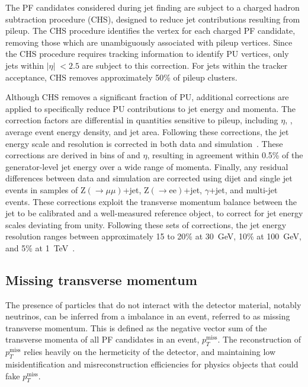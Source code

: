 The PF candidates considered during jet finding are subject to a charged hadron subtraction procedure (CHS), designed to reduce jet contributions resulting from pileup. The CHS procedure identifies the vertex for each charged PF candidate, removing those which are unambiguously associated with pileup vertices. Since the CHS procedure requires tracking information to identify PU vertices, only jets within $|\eta|\;<2.5$ are subject to this correction. For jets within the tracker acceptance, CHS removes approximately 50\% of pileup clusters.

Although CHS removes a significant fraction of PU, additional corrections are applied to specifically reduce PU contributions to jet energy and momenta. The correction factors are differential in quantities sensitive to pileup, including $\eta$, \pt, average event energy density, and jet area. Following these corrections, the jet energy scale and resolution is corrected in both data and simulation~\cite{JESAndJERCorrections}. These corrections are derived in bins of \pt and $\eta$, resulting in agreement within 0.5\% of the generator-level jet energy over a wide range of momenta. Finally, any residual differences between data and simulation are corrected using dijet and single jet events in samples of $\mathrm{Z}(\rightarrow\mu\mu)$+jet, $\mathrm{Z}(\rightarrow\mathrm{ee})$+jet, $\gamma$+jet, and multi-jet events. These corrections exploit the transverse momentum balance between the jet to be calibrated and a well-measured reference object, to correct for jet energy scales deviating from unity. Following these sets of corrections, the jet energy resolution ranges between approximately 15 to 20\% at 30~GeV, 10\% at 100~GeV, and 5\% at 1~TeV~\cite{JESAndJERCorrections}.

\subsection{Missing transverse momentum}
\label{subsec:mpt}


The presence of particles that do not interact with the detector material, notably neutrinos, can be inferred from a \pt imbalance in an event, referred to as missing transverse momentum. This is defined as the negative vector sum of the transverse momenta of all PF candidates in an event, $p_{T}^{\mathrm{miss}}$. The reconstruction of $p_{T}^{\mathrm{miss}}$ relies heavily on the hermeticity of the detector, and maintaining low misidentification and misreconstruction efficiencies for physics objects that could fake $p_{T}^{\mathrm{miss}}$.


